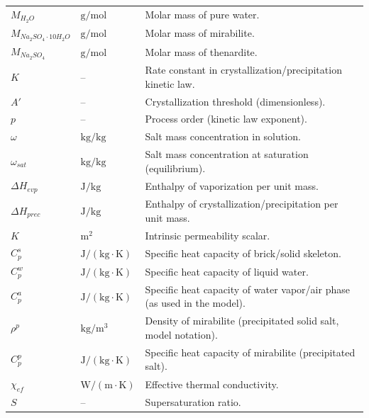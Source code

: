 \documentclass[12pt]{article}
\begin{document}
\begin{longtable}{p{2.5cm} p{3.0cm} p{9.0cm}}
$M_{H_2O}$ & $\mathrm{g/mol}$ & Molar mass of pure water.\\
$M_{Na_2SO_4\cdot 10H_2O}$ & $\mathrm{g/mol}$ & Molar mass of mirabilite.\\
$M_{Na_2SO_4}$ & $\mathrm{g/mol}$ & Molar mass of thenardite.\\
$K$ & -- & Rate constant in crystallization/precipitation kinetic law.\\
$A'$ & -- & Crystallization threshold (dimensionless).\\
$p$ & -- & Process order (kinetic law exponent).\\
$\omega$ & $\mathrm{kg/kg}$ & Salt mass concentration in solution.\\
$\omega_{sat}$ & $\mathrm{kg/kg}$ & Salt mass concentration at saturation (equilibrium).\\
$\Delta H_{evp}$ & $\mathrm{J/kg}$ & Enthalpy of vaporization per unit mass.\\
$\Delta H_{prec}$ & $\mathrm{J/kg}$ & Enthalpy of crystallization/precipitation per unit mass.\\
$K$ & $\mathrm{m^2}$ & Intrinsic permeability scalar.\\
$C_p^{s}$ & $\mathrm{J/(kg\cdot K)}$ & Specific heat capacity of brick/solid skeleton.\\
$C_p^{w}$ & $\mathrm{J/(kg\cdot K)}$ & Specific heat capacity of liquid water.\\
$C_p^{a}$ & $\mathrm{J/(kg\cdot K)}$ & Specific heat capacity of water vapor/air phase (as used in the model).\\
$\rho^{p}$ & $\mathrm{kg/m^3}$ & Density of mirabilite (precipitated solid salt, model notation).\\
$C_p^{p}$ & $\mathrm{J/(kg\cdot K)}$ & Specific heat capacity of mirabilite (precipitated salt).\\
$\chi_{ef}$ & $\mathrm{W/(m\cdot K)}$ & Effective thermal conductivity.\\
$S$ & -- & Supersaturation ratio.\\


\end{longtable}
\end{document}
